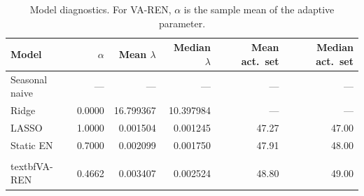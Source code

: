 \begin{table}[t]\centering
\caption{Model diagnostics. For VA-REN, $\alpha$ is the sample mean of the adaptive parameter.}
\label{tab:diagnostics}
\begin{tabular}{@{}lrrrrr@{}}\toprule
Model & $\alpha$ & Mean $\lambda$ & Median $\lambda$ & Mean act.\ set & Median act.\ set\\\midrule
Seasonal naive & --- & --- & --- & --- & ---\\
Ridge & 0.0000 & 16.799367 & 10.397984 & --- & ---\\
LASSO & 1.0000 & 0.001504 & 0.001245 & 47.27 & 47.00\\
Static EN & 0.7000 & 0.002099 & 0.001750 & 47.91 & 48.00\\
\\textbf{VA-REN} & 0.4662 & 0.003407 & 0.002524 & 48.80 & 49.00\\
\bottomrule\end{tabular}\end{table}
